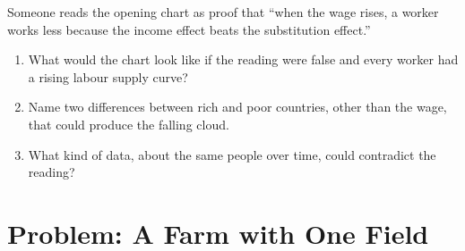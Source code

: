 \begin{exercise}[$\star\star\star$]\label{exo:b1:constrained-optimisation:falsify}
Someone reads the opening chart as proof that ``when the wage rises, a worker
works less because the income effect beats the substitution effect.''
\begin{enumerate}
  \item What would the chart look like if the reading were false and every worker had a rising labour supply curve?
  \item Name two differences between rich and poor countries, other than the wage, that could produce the falling cloud.
  \item What kind of data, about the same people over time, could contradict the reading?
\end{enumerate}
\end{exercise}

\section{Problem: A Farm with One Field}\label{sec:b1:constrained-optimisation:problem}

